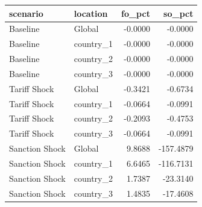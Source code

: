 \begin{tabular}{llrr}
\toprule
scenario & location & fo_pct & so_pct \\
\midrule
Baseline & Global & -0.0000 & -0.0000 \\
Baseline & country_1 & -0.0000 & -0.0000 \\
Baseline & country_2 & -0.0000 & -0.0000 \\
Baseline & country_3 & -0.0000 & -0.0000 \\
Tariff Shock & Global & -0.3421 & -0.6734 \\
Tariff Shock & country_1 & -0.0664 & -0.0991 \\
Tariff Shock & country_2 & -0.2093 & -0.4753 \\
Tariff Shock & country_3 & -0.0664 & -0.0991 \\
Sanction Shock & Global & 9.8688 & -157.4879 \\
Sanction Shock & country_1 & 6.6465 & -116.7131 \\
Sanction Shock & country_2 & 1.7387 & -23.3140 \\
Sanction Shock & country_3 & 1.4835 & -17.4608 \\
\bottomrule
\end{tabular}
